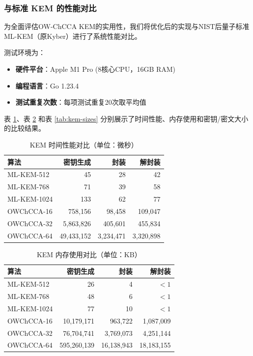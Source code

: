 \subsubsection{与标准 KEM 的性能对比}
\label{subsec:comp-mlkem}
为全面评估OW-ChCCA KEM的实用性，我们将优化后的实现与NIST后量子标准ML-KEM（原Kyber）进行了系统性能对比。

测试环境为：
\begin{itemize}
  \item \textbf{硬件平台}：Apple M1 Pro (8核心CPU，16GB RAM)
  \item \textbf{编程语言}：Go 1.23.4
  \item \textbf{测试重复次数}：每项测试重复20次取平均值
\end{itemize}

表 \ref{tab:kem-time-perf}、表 \ref{tab:kem-mem-usage} 和表 \ref{tab:kem-sizes} 分别展示了时间性能、内存使用和密钥/密文大小的比较结果。

\begin{table}[ht]
\centering
\caption{KEM 时间性能对比（单位：微秒）}
\label{tab:kem-time-perf}
\begin{tabular}{|l|r|r|r|}
\hline
\textbf{算法} & \textbf{密钥生成} & \textbf{封装} & \textbf{解封装} \\
\hline
ML-KEM-512    & 45                & 28            & 42              \\
ML-KEM-768    & 71                & 39            & 58              \\
ML-KEM-1024   & 133               & 62            & 77              \\
\hline
OWChCCA-16    & 758,156           & 98,458        & 109,047         \\
OWChCCA-32    & 5,863,826         & 405,601       & 455,834         \\
OWChCCA-64    & 49,433,152        & 3,234,471     & 3,320,898       \\
\hline
\end{tabular}
\end{table}

\begin{table}[ht]
\centering
\caption{KEM 内存使用对比（单位：KB）}
\label{tab:kem-mem-usage}
\begin{tabular}{|l|r|r|r|}
\hline
\textbf{算法} & \textbf{密钥生成} & \textbf{封装} & \textbf{解封装} \\
\hline
ML-KEM-512    & 26                & 4             & $<1$            \\
ML-KEM-768    & 48                & 6             & $<1$            \\
ML-KEM-1024   & 77                & 10            & $<1$            \\
\hline
OWChCCA-16    & 10,179,171        & 963,722       & 1,087,009       \\
OWChCCA-32    & 76,704,741        & 3,769,073     & 4,251,144       \\
OWChCCA-64    & 595,260,139       & 16,138,943    & 18,183,155      \\
\hline
\end{tabular}
\end{table}

